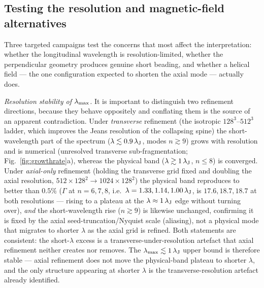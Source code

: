 \documentclass[usenatbib,twoside,twocolumn]{mnras}
\begin{document}
\subsection{Testing the resolution and magnetic-field alternatives}
\label{sec:optional_tests}
Three targeted campaigns test the concerns that most affect the interpretation: whether the longitudinal wavelength is resolution-limited, whether the perpendicular geometry produces genuine short beading, and whether a helical field --- the one configuration expected to shorten the axial mode --- actually does.

\emph{Resolution stability of $\lambda_{\rm max}$.} It is important to distinguish two refinement directions, because they behave oppositely and conflating them is the source of an apparent contradiction. Under \emph{transverse} refinement (the isotropic $128^3$--$512^3$ ladder, which improves the Jeans resolution of the collapsing spine) the short-wavelength part of the spectrum ($\lambda\lesssim0.9\,\lambda_{\rm J}$, modes $n\gtrsim9$) grows with resolution and is numerical (unresolved transverse sub-fragmentation; Fig.~\ref{fig:growthrate}a), whereas the physical band ($\lambda\gtrsim1\,\lambda_{\rm J}$, $n\leq8$) is converged. Under \emph{axial-only} refinement (holding the transverse grid fixed and doubling the axial resolution, $512\times128^2\to1024\times128^2$) the physical band reproduces to better than $0.5\%$ ($\Gamma$ at $n=6,7,8$, i.e.\ $\lambda=1.33,1.14,1.00\,\lambda_{\rm J}$, is $17.6,18.7,18.7$ at both resolutions --- rising to a plateau at the $\lambda\approx1\,\lambda_{\rm J}$ edge without turning over), \emph{and} the short-wavelength rise ($n\gtrsim9$) is likewise unchanged, confirming it is fixed by the axial seed-truncation/Nyquist scale (aliasing), not a physical mode that migrates to shorter $\lambda$ as the axial grid is refined. Both statements are consistent: the short-$\lambda$ excess is a transverse-under-resolution artefact that axial refinement neither creates nor removes. The $\lambda_{\rm max}\lesssim1\,\lambda_{\rm J}$ upper bound is therefore stable --- axial refinement does not move the physical-band plateau to shorter $\lambda$, and the only structure appearing at shorter $\lambda$ is the transverse-resolution artefact already identified.
\end{document}
